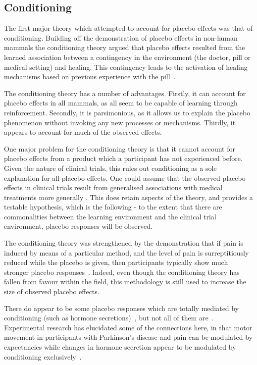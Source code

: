 \subsection{Conditioning}
\label{sec:conditioning}

The first major theory which attempted to account for placebo effects was that of conditioning. Building off the demonstration of placebo effects in non-human mammals \cite{Herrnstein1962} the conditioning theory argued that placebo effects resulted from the learned association between a contingency in the environment (the doctor, pill or medical setting) and healing. This contingency leads to the activation of healing mechanisms based on previous experience with the pill~\cite{Vodouris1989,Voudouris1985}.

The conditioning theory has a number of advantages. Firstly, it can account for placebo effects in all mammals, as all seem to be capable of learning through reinforcement. Secondly, it is parsimonious, as it allows us to explain the placebo phenomenon without invoking any new processes or mechanisms. Thirdly, it appears to account for much of the observed effects. 

One major problem for the conditioning theory is that it cannot account for placebo effects from a product which a participant  has not experienced before. Given the nature of clinical trials, this rules out   conditioning as a sole explanation for all placebo effects.  One could assume that the observed placebo effects in clinical trials result from generalised associations with medical treatments more generally \cite{pearce1987model}. This does retain aspects of the theory, and provides a testable hypothesis, which is the following - to the extent that there are commonalities between the learning environment and the clinical trial environment, placebo responses will be observed.  

The conditioning theory was strengthened by the demonstration that if
pain is induced by means of a particular method, and the level of pain
is surreptitiously reduced while the placebo is given, then
participants typically show much stronger placebo
responses~\cite{Voudouris1985,Colloca2006}. Indeed, even though the
conditioning theory has fallen from favour within the field, this
methodology is still used to increase the size of
observed placebo effects.


There do appear to be some placebo responses which are totally mediated by conditioning (such as hormone secretions)~\cite{Amanzio1999}, but not all of them are~\cite{benedetti2003a}. Experimental research has elucidated some of the connections here, in that motor movement in participants with Parkinson's disease and pain can be modulated by expectancies while changes in hormone secretion appear to be modulated by conditioning exclusively~\cite{benedetti2003a}.

